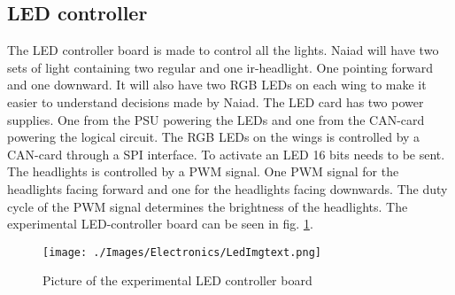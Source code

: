 \subsection{LED controller}
The LED controller board is made to control all the lights. Naiad will have two sets of light containing two regular and one ir-headlight. One pointing forward and one downward. It will also have two RGB LEDs on each wing to make it easier to understand decisions made by Naiad. The LED card has two power supplies. One from the PSU powering the LEDs and one from the CAN-card powering the logical circuit. The RGB LEDs on the wings is controlled by a CAN-card through a SPI interface. To activate an LED 16 bits needs to be sent. The headlights is controlled by a PWM signal. One PWM signal for the headlights facing forward and one for the headlights facing downwards. The duty cycle of the PWM signal determines the brightness of the headlights. The experimental LED-controller board can be seen in fig. \ref{LedImgText}.

\begin{figure}[!ht]
	\begin{center}
		\texttt{[image: ./Images/Electronics/LedImgtext.png]}
		\caption{Picture of the experimental LED controller board}
		\label{LedImgText}
	\end{center}
\end{figure}

	

